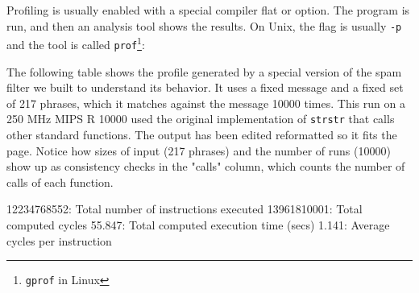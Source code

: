 Profiling is usually enabled with a special compiler flat or option. The
program is run, and then an analysis tool shows the results. On Unix, the
flag is usually \verb'-p' and the tool is called
\verb"prof"\footnote{\texttt{gprof} in Linux}:
\begin{wellcode}
\end{wellcode}
The following table shows the profile generated by a special version of the
spam filter we built to understand its behavior. It uses a fixed message
and a fixed set of 217 phrases, which it matches against the message
10000 times. This run on a 250 MHz MIPS R 10000 used the original
implementation of \verb'strstr' that calls other standard functions. The
output has been edited reformatted so it fits the page. Notice how sizes of
input (217 phrases) and the number of runs (10000) show up as consistency
checks in the "calls" column, which counts the number of calls of each
function.
\begin{wellcode}
    12234768552: Total number of instructions executed
    13961810001: Total computed cycles
    55.847: Total computed execution time (secs)
    1.141: Average cycles per instruction
\end{wellcode}

